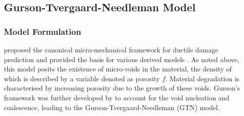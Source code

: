 \documentclass[sn-mathphys,Numbered]{sn-jnl}%
\begin{document}
\subsection{Gurson-Tvergaard-Needleman Model}

\subsubsection{Model Formulation}

\citet{gurson_continuum_1977} proposed the canonical micro-mechanical framework for ductile damage prediction and provided the basis for various derived models \citep{besson_continuum_2010, bettaieb_numerical_2011, achouri_numerical_2013, cao_models_2017, tekkaya_damage_2020}.
As noted above, this model posits the existence of micro-voids in the material, the density of which is described by a variable denoted as porosity $f$.
Material degradation is characterised by increasing porosity due to the growth of these voids.
Gurson’s framework was further developed by \citet{tvergaard_analysis_1984} to account for the void nucleation and coalescence, leading to the Gurson-Tvergaard-Needleman (GTN) model.

\end{document}
